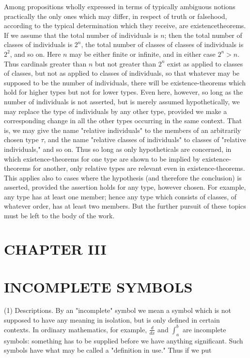 \documentclass[10pt]{article}
\begin{document}
Among propositions wholly expressed in terms of typically ambiguous notions practically the only ones which may differ, in respect of truth or falsehood, according to the typical determination which they receive, are existencetheorems. If we assume that the total number of individuals is $n$; then the total number of classes of individuals is $2^{n}$, the total number of classes of classes of individuals is $2^{2}$, and so on. Here $n$ may be either finite or infinite, and in either case $2^{n}>n$. Thus cardinals greater than $n$ but not greater than $2^{n}$ exist as applied to classes of classes, but not as applied to classes of individuals, so that whatever may be supposed to be the number of individuals, there will be existence-theorems which hold for higher types but not for lower types. Even here, however, so long as the number of individuals is not asserted, but is merely assumed hypothetically, we may replace the type of individuals by any other type, provided we make a corresponding change in all the other types occurring in the same context. That is, we may give the name "relative individuals" to the members of an arbitrarily chosen type $\tau$, and the name "relative classes of individuals" to classes of "relative individuals," and so on. Thus so long as only hypotheticals are concerned, in which existence-theorems for one type are shown to be implied by existence-theorems for another, only relative types are relevant even in existence-theorems. This applies also to cases where the hypothesis (and therefore the conclusion) is asserted, provided the assertion holds for any type, however chosen. For example, any type has at least one member; hence any type which consists of classes, of whatever order, has at least two members. But the further pursuit of these topics must be left to the body of the work.

\section*{CHAPTER III}
\section*{INCOMPLETE SYMBOLS}
(1) Descriptions. By an "incomplete" symbol we mean a symbol which is not supposed to have any meaning in isolation, but is only defined in certain contexts. In ordinary mathematics, for example, $\frac{d}{d x}$ and $\int_{a}^{b}$ are incomplete symbols: something has to be supplied before we have anything significant. Such symbols have what may be called a "definition in use." Thus if we put
\end{document}

